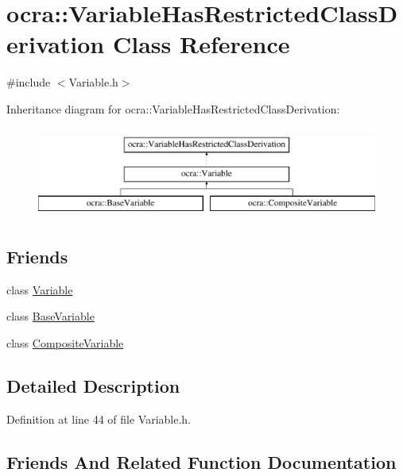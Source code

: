 \hypertarget{classocra_1_1VariableHasRestrictedClassDerivation}{}\section{ocra\+:\+:Variable\+Has\+Restricted\+Class\+Derivation Class Reference}
\label{classocra_1_1VariableHasRestrictedClassDerivation}


{\ttfamily \#include $<$Variable.\+h$>$}

Inheritance diagram for ocra\+:\+:Variable\+Has\+Restricted\+Class\+Derivation\+:\begin{figure}[H]
\begin{center}
\leavevmode
\includegraphics[height=3.000000cm]{dc/d20/classocra_1_1VariableHasRestrictedClassDerivation}
\end{center}
\end{figure}
\subsection*{Friends}
\begin{DoxyCompactItemize}
\item 
class \hyperlink{classocra_1_1VariableHasRestrictedClassDerivation_a9b0a9a1a9dc58fc36b535bb33c612b49}{Variable}
\item 
class \hyperlink{classocra_1_1VariableHasRestrictedClassDerivation_a5136a88d8c0a1d58621286f1c82a7b45}{Base\+Variable}
\item 
class \hyperlink{classocra_1_1VariableHasRestrictedClassDerivation_a5ab4ec1f2934216b6101035293996613}{Composite\+Variable}
\end{DoxyCompactItemize}


\subsection{Detailed Description}


Definition at line 44 of file Variable.\+h.



\subsection{Friends And Related Function Documentation}
\hypertarget{classocra_1_1VariableHasRestrictedClassDerivation_a5136a88d8c0a1d58621286f1c82a7b45}{}\label{classocra_1_1VariableHasRestrictedClassDerivation_a5136a88d8c0a1d58621286f1c82a7b45} 
